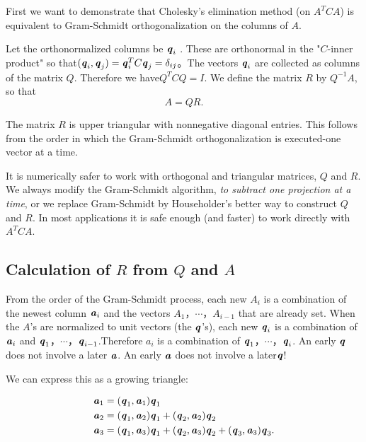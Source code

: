 First we want to demonstrate that Cholesky's elimination method (on $A^{T}CA$) is equivalent to Gram-Schmidt orthogonalization on the columns of $A$.

Let the orthonormalized columns be $\textbf{\textit{q}}_{i}$ . These are orthonormal in the "$C$-inner product" so that$(\textbf{\textit{q}}_{i},\textbf{\textit{q}}_{j})=\textbf{\textit{q}}^T_iC\textbf{\textit{q}}_{j}=\delta_{ij}$。The vectors $\textbf{\textit{q}}_{i}$ are collected as columns of the matrix $Q$. Therefore we have$Q^{T}CQ=I $. We define the matrix $R$ by $Q^{-1} A$, so that
$$A=QR.$$

\begin{flushleft}
The matrix $R$ is upper triangular with nonnegative diagonal entries. This follows from the order in which the Gram-Schmidt orthogonalization is executed-one vector at a time.
\end{flushleft}

It is numerically safer to work with orthogonal and triangular matrices, $Q$ and $R$. We always modify the Gram-Schmidt algorithm, \textit{to subtract one projection at a time}, or we replace Gram-Schmidt by Householder's better way to construct $Q$ and $R$. In most applications it is safe enough (and faster) to work directly with $A^{T}CA$.
  
    	\subsection{Calculation of $R$ from $Q$ and $A$}
    	
\begin{flushleft}
	From the order of the Gram-Schmidt process, each new $A_{i}$ is a combination of the newest
column $\textbf{\textit{a}}_{i}$ and the vectors $A_{1}$，$\cdots$，$A_{i-1}$ that are already set. When the $A$'s are normalized to unit vectors (the $\textbf{\textit{q}}$'s), each new $\textbf{\textit{q}}_{i}$ is a combination of $\textbf{\textit{a}}_{i}$ and $\textbf{\textit{q}}_{1}$，$\cdots$，$\textbf{\textit{q}}_{ i-1}$.Therefore $a_{i}$ is a combination of $\textbf{\textit{q}}_{1}$，$ \cdots$，$\textbf{\textit{q}}_{i}$. An early $\textbf{\textit{q}}$ does not involve a later $\textbf{\textit{a}}$. An early $\textbf{\textit{a}}$ does not involve a later$ \textbf{\textit{q}}$!
\end{flushleft}

We can express this as a growing triangle:

\begin{align}
\textbf{\textit{a}}_{1}&=(\textbf{\textit{q}}_{1},\textbf{\textit{a}}_{1})\textbf{\textit{q}}_{1}
 \\
\textbf{\textit{a}}_{2}&=(\textbf{\textit{q}}_{1},\textbf{\textit{a}}_{2})\textbf{\textit{q}}_{1}+(\textbf{\textit{q}}_{2},\textbf{\textit{a}}_{2})\textbf{\textit{q}}_{2}
\\
\textbf{\textit{a}}_{3}&=(\textbf{\textit{q}}_{1},\textbf{\textit{a}}_{3})\textbf{\textit{q}}_{1}+(\textbf{\textit{q}}_{2},\textbf{\textit{a}}_{3})\textbf{\textit{q}}_{2}+(\textbf{\textit{q}}_{3},\textbf{\textit{a}}_{3})\textbf{\textit{q}}_{3}.
\end{align}

